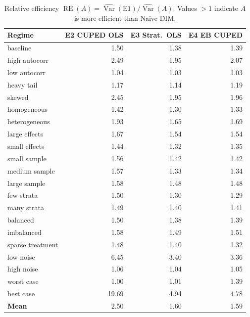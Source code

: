 \documentclass[11pt,letterpaper]{article}
\newcommand{\Var}{\operatorname{Var}}
\newcommand{\RE}{\operatorname{RE}}
\begin{document}
\begin{table}[htbp]
\centering
\caption{Relative efficiency $\RE(A) = \widehat{\Var}(\text{E1}) /
\widehat{\Var}(A)$.  Values $> 1$ indicate $A$ is more efficient than
Naive DIM.}
\label{tab:re}
\small
\begin{tabular}{@{}l rrr@{}}
\toprule
Regime & E2 CUPED OLS & E3 Strat.\ OLS & E4 EB CUPED \\
\midrule
baseline            & 1.50 & 1.38 & 1.39 \\
high autocorr       & 2.49 & 1.95 & 2.07 \\
low autocorr        & 1.04 & 1.03 & 1.03 \\
heavy tail          & 1.17 & 1.14 & 1.19 \\
skewed              & 2.45 & 1.95 & 1.96 \\
homogeneous         & 1.42 & 1.30 & 1.33 \\
heterogeneous       & 1.93 & 1.65 & 1.69 \\
large effects       & 1.67 & 1.54 & 1.54 \\
small effects       & 1.44 & 1.32 & 1.35 \\
small sample        & 1.56 & 1.42 & 1.42 \\
medium sample       & 1.57 & 1.33 & 1.34 \\
large sample        & 1.58 & 1.48 & 1.48 \\
few strata          & 1.50 & 1.30 & 1.29 \\
many strata         & 1.49 & 1.40 & 1.41 \\
balanced            & 1.50 & 1.38 & 1.39 \\
imbalanced          & 1.58 & 1.49 & 1.51 \\
sparse treatment    & 1.48 & 1.40 & 1.32 \\
low noise           & 6.45 & 3.40 & 3.36 \\
high noise          & 1.06 & 1.04 & 1.05 \\
worst case          & 1.00 & 1.01 & 1.39 \\
best case           & 19.69 & 4.94 & 4.78 \\
\midrule
\textbf{Mean}       & 2.50 & 1.60 & 1.59 \\
\bottomrule
\end{tabular}
\end{table}
\end{document}
